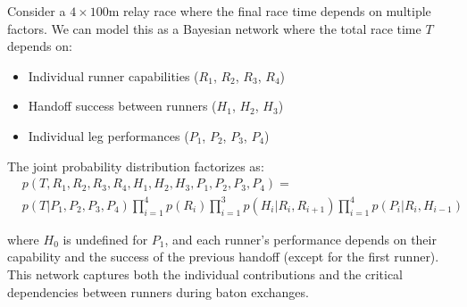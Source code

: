 \documentclass{article}
\begin{document}
  \begin{example}
    Consider a $4\times100$m relay race where the final race time depends on multiple factors. We can model this as a Bayesian network where the total race time $T$ depends on:
    \begin{itemize}
      \item Individual runner capabilities ($R_1$, $R_2$, $R_3$, $R_4$)
      \item Handoff success between runners ($H_1$, $H_2$, $H_3$)
      \item Individual leg performances ($P_1$, $P_2$, $P_3$, $P_4$)
    \end{itemize}

    The joint probability distribution factorizes as:
    \begin{align*}
      & p(T, R_1, R_2, R_3, R_4, H_1, H_2, H_3, P_1, P_2, P_3, P_4) = \\
      & p(T|P_1,P_2,P_3,P_4) \prod_{i=1}^4 p(R_i) \prod_{i=1}^3 p(H_i|R_i,R_{i+1}) \prod_{i=1}^4 p(P_i|R_i,H_{i-1})
    \end{align*}

    \noindent where $H_0$ is undefined for $P_1$, and each runner's performance depends on their capability and the success of the previous handoff (except for the first runner). This network captures both the individual contributions and the critical dependencies between runners during baton exchanges.

    \begin{figure}[H]
      \centering 
\end{figure}
\end{example}
\end{document}
